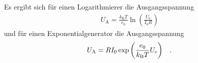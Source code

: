Es ergibt sich für einen Logarithmierer die Ausgangsspannung 
\begin{align}
U_\text{A}=\frac{k_\text{B}T}{e_0}\ln \left(\frac{U_\text{e}}{I_0 R}\right)
\end{align}
und für einen Exponentialgenerator die Ausgangsspannung
\begin{align}
U_\text{A}=RI_0\exp \left(\frac{e_0}{k_\text{B} T}U_\text{e}\right)\hspace{0.3cm}\text{.}
\end{align}
